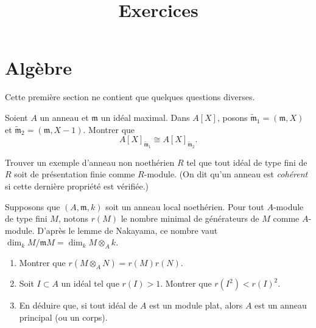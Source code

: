 

%


\title{Exercices}


\maketitle

\label{section-phantom}

\tableofcontents


\section{Algèbre}
\label{section-algebra}

\noindent
Cette première section ne contient que quelques questions diverses.

\begin{exercise}
\label{exercise-isomorphism-localizations}
Soient $A$ un anneau et ${\mathfrak m}$ un idéal maximal. Dans $A[X]$,
posons $\tilde {\mathfrak m}_1 = ({\mathfrak m}, X)$ et
$\tilde {\mathfrak m}_2 = ({\mathfrak m}, X-1)$. Montrer
que
$$
A[X]_{\tilde {\mathfrak m}_1} \cong A[X]_{\tilde {\mathfrak m}_2}.
$$
\end{exercise}

\begin{exercise}
\label{exercise-coherent}
Trouver un exemple d'anneau non noethérien $R$ tel que tout idéal
de type fini de $R$ soit de présentation finie comme $R$-module.
(On dit qu'un anneau est {\it cohérent} si cette dernière propriété est vérifiée.)
\end{exercise}

\begin{exercise}
\label{exercise-flat-ideals-pid}
Supposons que $(A, {\mathfrak m}, k)$ soit un anneau local noethérien. Pour tout
$A$-module de type fini $M$, notons $r(M)$ le nombre minimal
de générateurs de $M$ comme $A$-module. D'après le lemme de Nakayama, ce nombre vaut
$\dim_k M/{\mathfrak m} M = \dim_k M \otimes_A k$.
\begin{enumerate}
\item Montrer que $r(M \otimes_A N) = r(M)r(N)$.
\item Soit $I\subset A $ un idéal tel que $r(I) > 1$. Montrer que
$r(I^2) < r(I)^2$.
\item En déduire que, si tout idéal de $A$ est un module plat, alors
$A$ est un anneau principal (ou un corps).
\end{enumerate}
\end{exercise}

